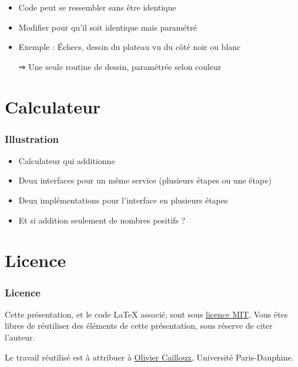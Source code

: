 \documentclass[english, french]{beamer}
\begin{document}
\begin{frame}
	\frametitle{\subsecname}
	\begin{itemize}
		\item Code peut se ressembler sans être identique
		\item Modifier pour qu’il soit identique mais paramétré
		\item Exemple : Échecs, dessin du plateau vu du côté noir ou blanc
		\item[⇒] Une seule routine de dessin, paramétrée selon couleur
	\end{itemize}
\end{frame}

\section{Calculateur}
\begin{frame}
	\frametitle{Illustration}
	\begin{itemize}
		\item Calculateur qui additionne
		\item Deux interfaces pour un même service (plusieurs étapes ou une étape)
		\item Deux implémentations pour l’interface en plusieurs étapes
		\item Et si addition seulement de nombres positifs ?
	\end{itemize}
\end{frame}

\appendix
\section{Licence}
\begin{frame}
	\frametitle{Licence}
	Cette présentation, et le code LaTeX associé, sont sous \href{http://opensource.org/licenses/MIT}{licence MIT}. Vous êtes libres de réutiliser des éléments de cette présentation, sous réserve de citer l’auteur.
	
	Le travail réutilisé est à attribuer à \href{http://www.lamsade.dauphine.fr/~ocailloux/}{Olivier Cailloux}, Université Paris-Dauphine.
\end{frame}
\end{document}
